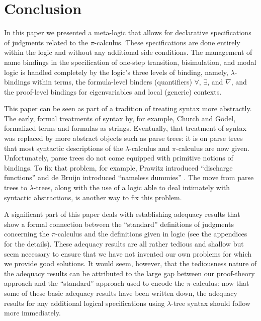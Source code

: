 \documentclass{acmtrans2m}
\begin{document}
\section{Conclusion}
\label{sec:conc}

In this paper we presented a meta-logic that allows for declarative specifications of
judgments related to the $\pi$-calculus.
These specifications are done entirely within the logic and without any
additional side conditions.  The management of name bindings in the
specification of one-step transition, bisimulation, and modal logic is
handled completely by the logic's three levels of binding,
namely, $\lambda$-bindings within terms, the formula-level
binders (quantifiers) $\forall$, $\exists$, and $\nabla$, and the
proof-level bindings for eigenvariables and local (generic) contexts.

This paper can be seen as part of a tradition of treating
syntax more abstractly.   The early, formal treatments of syntax by, for
example, Church and G\"odel, formalized terms and formulas as strings.
Eventually, that treatment of syntax was replaced by more abstract
objects such as parse trees: it is on parse trees that most
syntactic descriptions of the $\lambda$-calculus and $\pi$-calculus
are now given.  Unfortunately, parse trees do not come equipped with
primitive notions of bindings.  To fix that problem, for example,
Prawitz introduced ``discharge functions'' \cite{prawitz65} and de
Bruijn introduced ``nameless dummies'' \cite{debruijn72}.  The move
from parse trees to $\lambda$-trees, along with the use of a logic
able to deal intimately with syntactic abstractions, is another way to
fix this problem.

A significant part of this paper deals with establishing adequacy
results that show a formal connection between the ``standard''
definitions of judgments concerning the $\pi$-calculus and the
definitions given in logic (see the appendices for the details).
These adequacy results are all 
rather tedious and shallow but seem necessary to ensure that we have
not invented our own problems for which we provide good solutions.  It
would seem, however, that the tediousness nature of the adequacy
results can be
attributed to the large gap between our proof-theory approach and
the ``standard'' approach used to encode the
$\pi$-calculus: now that some of these basic adequacy results have
been written down, the adequacy results for any additional logical
specifications using $\lambda$-tree syntax should follow more
immediately.
\end{document}
